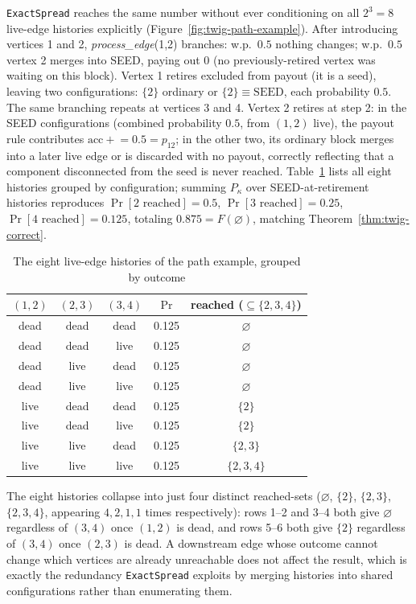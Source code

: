 \documentclass[ASNA,number]{USG}
\newcommand{\up}{\rule{0pt}{2.6ex}}
\newcommand{\down}{\rule[-1.2ex]{0pt}{0pt}}
\begin{document}
\texttt{ExactSpread} reaches the same number without ever conditioning on
all $2^3=8$ live-edge histories explicitly (Figure~\ref{fig:twig-path-example}).
After introducing vertices 1 and 2, \emph{process\_edge}(1,2) branches: w.p.\
$0.5$ nothing changes; w.p.\ $0.5$ vertex 2 merges into SEED, paying out
$0$ (no previously-retired vertex was waiting on this block). Vertex 1
retires excluded from payout (it is a seed), leaving two configurations:
$\{2\}$ ordinary or $\{2\}\equiv\mathrm{SEED}$, each probability $0.5$. The
same branching repeats at vertices 3 and 4. Vertex 2 retires at step 2: in
the SEED configurations (combined probability $0.5$, from $(1,2)$ live),
the payout rule contributes $\mathrm{acc}\mathrel{+}=0.5=p_{12}$; in the
other two, its ordinary block merges into a later live edge or is
discarded with no payout, correctly reflecting that a component
disconnected from the seed is never reached. Table~\ref{tab:twig-example}
lists all eight histories grouped by configuration; summing $P_\kappa$
over SEED-at-retirement histories reproduces
$\Pr[2\text{ reached}]=0.5$, $\Pr[3\text{ reached}]=0.25$,
$\Pr[4\text{ reached}]=0.125$, totaling $0.875=F(\varnothing)$, matching
Theorem~\ref{thm:twig-correct}.

\begin{table}[h]
\centering
\caption{The eight live-edge histories of the path example, grouped by outcome\label{tab:twig-example}}
\begin{tabular}{@{}ccccc@{}}
\hline
\up $(1,2)$ & $(2,3)$ & $(3,4)$ & $\Pr$ & reached ($\subseteq\{2,3,4\}$) \\
\hline
\up dead & dead & dead & 0.125 & $\varnothing$ \\
dead & dead & live & 0.125 & $\varnothing$ \\
dead & live & dead & 0.125 & $\varnothing$ \\
dead & live & live & 0.125 & $\varnothing$ \\
live & dead & dead & 0.125 & $\{2\}$ \\
live & dead & live & 0.125 & $\{2\}$ \\
live & live & dead & 0.125 & $\{2,3\}$ \\
\down live & live & live & 0.125 & $\{2,3,4\}$ \\
\hline
\end{tabular}
The eight histories collapse into just four distinct reached-sets
($\varnothing$, $\{2\}$, $\{2,3\}$, $\{2,3,4\}$, appearing $4,2,1,1$ times
respectively): rows 1--2 and 3--4 both give $\varnothing$ regardless of
$(3,4)$ once $(1,2)$ is dead, and rows 5--6 both give $\{2\}$ regardless of
$(3,4)$ once $(2,3)$ is dead. A downstream edge whose outcome cannot change
which vertices are already unreachable does not affect the result, which
is exactly the redundancy \texttt{ExactSpread} exploits by merging
histories into shared configurations rather than enumerating them.
\end{table}
\end{document}
